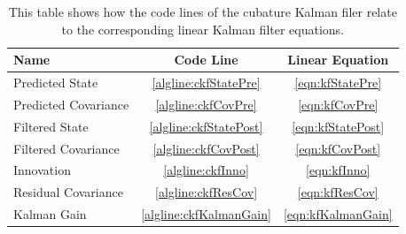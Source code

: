 		\begin{table}
			\centering
			\begin{tabular}{l|c|c}
				\textbf{Name}        &     \textbf{Code Line}      & \textbf{Linear Equation} \\ \hline
				Predicted State      &  \ref{algline:ckfStatePre}  &  \eqref{eqn:kfStatePre}  \\
				Predicted Covariance &   \ref{algline:ckfCovPre}   &   \eqref{eqn:kfCovPre}   \\
				Filtered State       & \ref{algline:ckfStatePost}  & \eqref{eqn:kfStatePost}  \\
				Filtered Covariance  &  \ref{algline:ckfCovPost}   &  \eqref{eqn:kfCovPost}   \\
				Innovation           &    \ref{algline:ckfInno}    &    \eqref{eqn:kfInno}    \\
				Residual Covariance  &   \ref{algline:ckfResCov}   &   \eqref{eqn:kfResCov}   \\
				Kalman Gain          & \ref{algline:ckfKalmanGain} & \eqref{eqn:kfKalmanGain}
			\end{tabular}
			\caption[Correspondence between the cubature and non-cubature Kalman filter]{This table shows how the code lines of the cubature Kalman filer relate to the corresponding linear Kalman filter equations.}
			\label{tab:cubatureKalmanFilter}
		\end{table}


